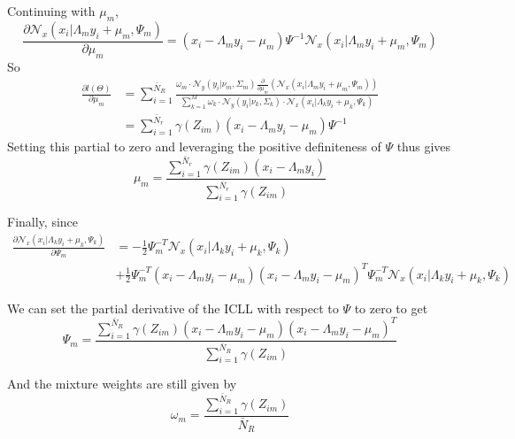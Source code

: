 Continuing with $\mu_m$, 
\begin{equation}
\frac{\partial\mathcal{N}_x\left(x_i\vert\Lambda_my_i + \mu_m,\Psi_m\right)}{\partial \mu_m} = \left(x_i - \Lambda_my_i - \mu_m\right)\Psi^{-1}\mathcal{N}_x\left(x_i\vert\Lambda_my_i + \mu_m,\Psi_m\right)
\end{equation}
So
\begin{align}
\frac{\partial l(\Theta)}{\partial \mu_m} &= \sum\limits_{i = 1}^{\bar{N}_R}
\frac{\omega_m\cdot
\mathcal{N}_y\left(y_i\vert\nu_m,\Sigma_m\right)\frac{\partial }{\partial \mu_m}\left(\mathcal{N}_x\left(x_i\vert\Lambda_my_i + \mu_m,\Psi_m\right)\right)}{\sum\limits_{k = 1}^{M}\omega_k\cdot
\mathcal{N}_y\left(y_i\vert\nu_k,\Sigma_k\right)\cdot\mathcal{N}_x\left(x_i\vert\Lambda_ky_i + \mu_k,\Psi_k\right) }\\
&= \sum\limits_{i = 1}^{\bar{N}_r}\gamma(Z_{im})\left(x_i - \Lambda_my_i - \mu_m\right)\Psi^{-1}
\end{align}
Setting this partial to zero and leveraging the positive definiteness of $\Psi$ thus gives
\begin{equation}
\boxed{\mu_m = \frac{\sum\limits_{i = 1}^{\bar{N}_r}\gamma(Z_{im})\left(x_i - \Lambda_my_i\right)}{\sum\limits_{i = 1}^{\bar{N}_r}\gamma(Z_{im})} }
\end{equation}

Finally, since
\begin{align}
\frac{\partial\mathcal{N}_x\left(x_i\vert\Lambda_ky_i + \mu_k,\Psi_k\right)}{\partial \Psi_m} &= -\frac{1}{2}\Psi_m^{-T}\mathcal{N}_x\left(x_i\vert\Lambda_ky_i + \mu_k,\Psi_k\right) \nonumber\\
&+ \frac{1}{2}
\Psi_m^{-T}\left(x_i -\Lambda_my_i - \mu_m\right)\left(x_i -\Lambda_my_i - \mu_m\right)^T\Psi_m^{-T}\mathcal{N}_x\left(x_i\vert\Lambda_ky_i + \mu_k,\Psi_k\right)
\end{align}

We can set the partial derivative of the ICLL with respect to $\Psi$ to zero to get
\begin{equation}
\boxed{
\Psi_m = \frac{  \sum\limits_{i = 1}^{\bar{N}_R} \gamma(Z_{im})\left(x_i -\Lambda_my_i - \mu_m\right)\left(x_i -\Lambda_my_i - \mu_m\right)^T }{  \sum\limits_{i = 1}^{\bar{N}_R}\gamma(Z_{im})}}
\end{equation}

And the mixture weights are still given by
\begin{equation}
\boxed{
\omega_m = \frac{\sum\limits_{i = 1}^{\bar{N}_R}\gamma(Z_{im})}{\bar{N}_R}}
\end{equation}


